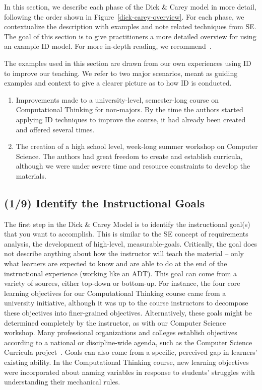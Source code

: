 In this section, we describe each phase of the Dick \& Carey model in more detail, following the order shown in Figure~\ref{dick-carey-overview}.
For each phase, we contextualize the description with examples and note related techniques from SE.
The goal of this section is to give practitioners a more detailed overview for using an example ID model.
For more in-depth reading, we
recommend~\citep{dick2005systematic,gagne2005principles}.

The examples used in this section are drawn from our own experiences using ID to improve our teaching.
We refer to two major scenarios, meant as guiding examples and context to give a clearer picture as to how ID is conducted.
\vspace{-\medskipamount}
 
\begin{enumerate}
\item Improvements made to a university-level, semester-long course on Computational Thinking for non-majors.
By the time the authors started applying ID techniques to improve the course, it had already been created and offered several times.
\item The creation of a high school level, week-long summer workshop on Computer Science.
The authors had great freedom to create and establish curricula, although we were under severe time and resource constraints to develop the materials.
\end{enumerate}


\subsection{ (1/9) Identify the Instructional Goals}
\label{IdentifyGoals}

The first step in the Dick \& Carey Model is to identify the instructional goal(s) that you want to accomplish.
This is similar to the SE concept of requirements analysis, the development of high-level, measurable-goals.
Critically, the goal does not describe anything about how the instructor will teach the material -- only what learners are expected to know and are able to do at the end of the instructional experience (working like an ADT).
This goal can come from a variety of sources, either top-down or bottom-up.
For instance, the four core learning objectives for our Computational Thinking course came from a university initiative, although it was up to the course instructors to decompose these objectives into finer-grained objectives.
Alternatively, these goals might be determined completely by the instructor, as with our Computer Science workshop.
Many professional organizations and colleges establish objectives according to a national or discipline-wide agenda, such as the Computer Science Curricula project~\citep{CS2013}.
Goals can also come from a specific, perceived gap in learners' existing ability.
In the Computational Thinking course, new learning objectives were incorporated about naming variables in response to students' struggles with understanding their mechanical rules.

